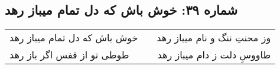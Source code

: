 \begin{center}
\section*{شماره ۳۹: خوش باش که دل تمام میباز رهد}
\label{sec:039}
\begin{longtable}{l p{0.5cm} r}
خوش باش که دل تمام میباز رهد
&&
وز محنتِ ننگ و نام میباز رهد
\\
طوطی تو از قفس اگر باز رهد
&&
طاووسِ دلت ز دام میباز رهد
\\
\end{longtable}
\end{center}
